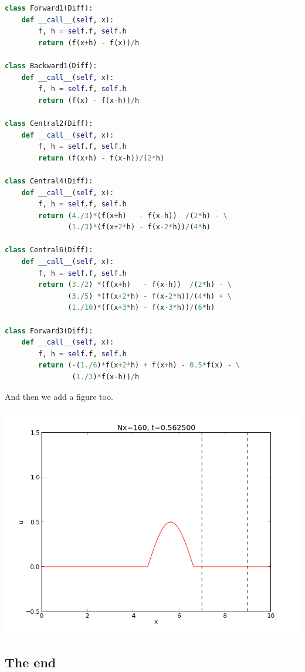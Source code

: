 \documentclass[%
oneside,                 %
final,                   %
10pt]{article}
\newenvironment{noticeshaded}
{\def\FrameCommand{\fboxsep=3mm\colorbox{colors1_notice_background}}
 \MakeFramed {\advance\hsize-\width \FrameRestore}}{\endMakeFramed}
\newenvironment{notice_colors1admon}[1][Notice]{
\begin{noticeshaded}
\noindent
\texttt{[image: latex\_figs/notice]}\ \ \   \textbf{#1}\\ \par
\vspace{-3mm}\nobreak\noindent\ignorespaces
}
{
\end{noticeshaded}
}
\begin{document}
\begin{notice_colors1admon}
\begin{lstlisting}[language=python,style=simple,xleftmargin=2mm]
class Forward1(Diff):
    def __call__(self, x):
        f, h = self.f, self.h
        return (f(x+h) - f(x))/h

class Backward1(Diff):
    def __call__(self, x):
        f, h = self.f, self.h
        return (f(x) - f(x-h))/h

class Central2(Diff):
    def __call__(self, x):
        f, h = self.f, self.h
        return (f(x+h) - f(x-h))/(2*h)

class Central4(Diff):
    def __call__(self, x):
        f, h = self.f, self.h
        return (4./3)*(f(x+h)   - f(x-h))  /(2*h) - \
               (1./3)*(f(x+2*h) - f(x-2*h))/(4*h)

class Central6(Diff):
    def __call__(self, x):
        f, h = self.f, self.h
        return (3./2) *(f(x+h)   - f(x-h))  /(2*h) - \
               (3./5) *(f(x+2*h) - f(x-2*h))/(4*h) + \
               (1./10)*(f(x+3*h) - f(x-3*h))/(6*h)

class Forward3(Diff):
    def __call__(self, x):
        f, h = self.f, self.h
        return (-(1./6)*f(x+2*h) + f(x+h) - 0.5*f(x) - \
                (1./3)*f(x-h))/h

\end{lstlisting}

And then we add a figure too.

\vspace{6mm}

\centerline{\includegraphics[width=0.7\linewidth]{testfigs/wave1D.png}}

\vspace{6mm}
\end{notice_colors1admon} %



\subsection{The end}
\end{document}
